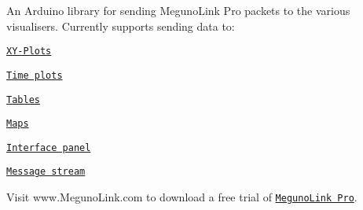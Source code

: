 An Arduino library for sending Meguno\-Link Pro packets to the various visualisers. Currently supports sending data to\-:
\begin{DoxyItemize}
\item \href{http://www.megunolink.com/documentation/plotting/}{\tt X\-Y-\/\-Plots}
\item \href{http://www.megunolink.com/documentation/plotting/}{\tt Time plots}
\item \href{http://www.megunolink.com/documentation/table/}{\tt Tables}
\item \href{http://www.megunolink.com/documentation/mapping/}{\tt Maps}
\item \href{http://www.megunolink.com/documentation/interface-panel/}{\tt Interface panel}
\item \href{http://www.megunolink.com/documentation/monitoring-data/}{\tt Message stream}
\end{DoxyItemize}

Visit www.\-Meguno\-Link.\-com to download a free trial of \href{http://www.MegunoLink.com}{\tt Meguno\-Link Pro}. 